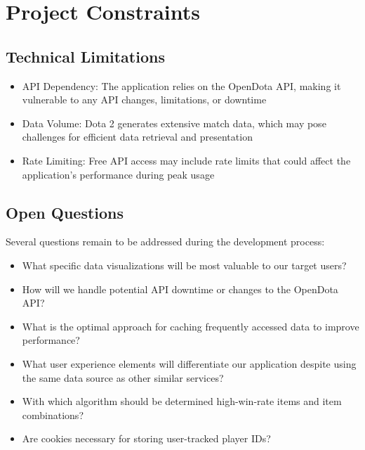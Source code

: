 \section{Project Constraints}
\subsection{Technical Limitations}
\begin{itemize}
    \item API Dependency: The application relies on the OpenDota API, making it vulnerable to any API changes, limitations, or downtime
    \item Data Volume: Dota 2 generates extensive match data, which may pose challenges for efficient data retrieval and presentation
    \item Rate Limiting: Free API access may include rate limits that could affect the application's performance during peak usage
\end{itemize}

\subsection{Open Questions}
Several questions remain to be addressed during the development process:
\begin{itemize}
    \item What specific data visualizations will be most valuable to our target users?
    \item How will we handle potential API downtime or changes to the OpenDota API?
    \item What is the optimal approach for caching frequently accessed data to improve performance?
    \item What user experience elements will differentiate our application despite using the same data source as other similar services?
    \item With which algorithm should be determined high-win-rate items and item combinations?
    \item Are cookies necessary for storing user-tracked player IDs?
\end{itemize}